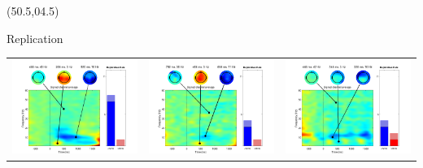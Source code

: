 \documentclass[final]{beamer}
\begin{document}
\begin{frame}{}
\begin{textblock}{67}(50.5,04.5)
\begin{block}{Replication}
\small
\begin{tabular}{c c c}
\includegraphics{gamma01} & \includegraphics{gamma02} & \includegraphics{gamma03} \\

\end{tabular}
\end{block}
\end{textblock}
\end{frame}
\end{document}
